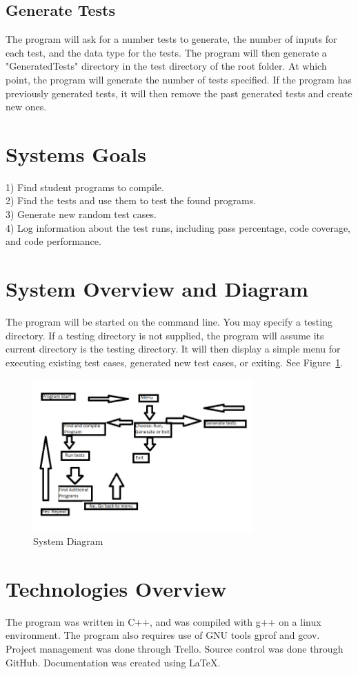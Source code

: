\subsection{ Generate Tests}
The program will ask for a number tests to generate, the number of inputs for
each test, and the data type for the tests. The program will then generate a "GeneratedTests" directory in the test directory of the root
folder. At which point, the program will generate the number of tests specified. If the program has previously generated tests, it will
then remove the past generated tests and create new ones. 


\section{Systems Goals}
1) Find student programs to compile.\\
2) Find the tests and use them to test the found programs.\\
3) Generate new random test cases.\\
4) Log information about the test runs, including pass percentage, code coverage, and code performance.

\section{System Overview and Diagram}
The program will be started on the command line. You may specify a testing directory. If a testing directory is not supplied, the program will assume its current directory is the testing directory. It will then display a simple menu for executing existing test cases, generated new test cases, or exiting.  See Figure~\ref{systemdiagram}.

\begin{figure}[tbh]
\begin{center}
\includegraphics[width=0.75\textwidth]{./SystemDiagram}
\end{center}
\caption{System Diagram \label{systemdiagram}}
\end{figure}

\section{Technologies Overview}
The program was written in C++, and was compiled with g++ on a linux environment. The program also requires use of GNU tools gprof and gcov. Project management was done through Trello. Source control was done through GitHub. Documentation was created using \LaTeX.
